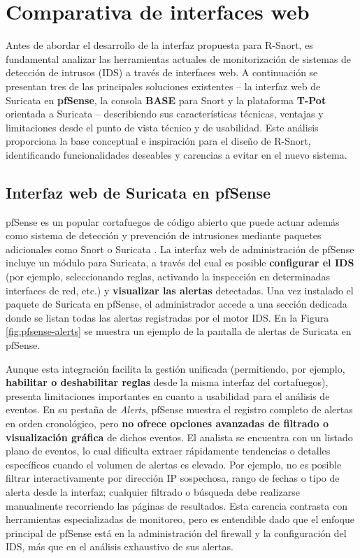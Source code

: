 \documentclass[11pt,a4paper,twoside]{report}
\begin{document}
\section{Comparativa de interfaces web}
Antes de abordar el desarrollo de la interfaz propuesta para R-Snort, es fundamental analizar las herramientas actuales de monitorización de sistemas de detección de intrusos (IDS) a través de interfaces web. A continuación se presentan tres de las principales soluciones existentes -- la interfaz web de Suricata en \textbf{pfSense}, la consola \textbf{BASE} para Snort y la plataforma \textbf{T-Pot} orientada a Suricata -- describiendo sus características técnicas, ventajas y limitaciones desde el punto de vista técnico y de usabilidad. Este análisis proporciona la base conceptual e inspiración para el diseño de R-Snort, identificando funcionalidades deseables y carencias a evitar en el nuevo sistema.\newline

\subsection{Interfaz web de Suricata en pfSense}
pfSense es un popular cortafuegos de código abierto que puede actuar además como sistema de detección y prevención de intrusiones mediante paquetes adicionales como Snort o Suricata \cite{pfsense}. La interfaz web de administración de pfSense incluye un módulo para Suricata, a través del cual es posible \textbf{configurar el IDS} (por ejemplo, seleccionando reglas, activando la inspección en determinadas interfaces de red, etc.) y \textbf{visualizar las alertas} detectadas. Una vez instalado el paquete de Suricata en pfSense, el administrador accede a una sección dedicada donde se listan todas las alertas registradas por el motor IDS. En la Figura \ref{fig:pfsense-alerts} se muestra un ejemplo de la pantalla de alertas de Suricata en pfSense.\newline

Aunque esta integración facilita la gestión unificada (permitiendo, por ejemplo, \textbf{habilitar o deshabilitar reglas} desde la misma interfaz del cortafuegos), presenta limitaciones importantes en cuanto a usabilidad para el análisis de eventos. En su pestaña de \emph{Alerts}, pfSense muestra el registro completo de alertas en orden cronológico, pero \textbf{no ofrece opciones avanzadas de filtrado o visualización gráfica} de dichos eventos. El analista se encuentra con un listado plano de eventos, lo cual dificulta extraer rápidamente tendencias o detalles específicos cuando el volumen de alertas es elevado. Por ejemplo, no es posible filtrar interactivamente por dirección IP sospechosa, rango de fechas o tipo de alerta desde la interfaz; cualquier filtrado o búsqueda debe realizarse manualmente recorriendo las páginas de resultados. Esta carencia contrasta con herramientas especializadas de monitoreo, pero es entendible dado que el enfoque principal de pfSense está en la administración del firewall y la configuración del IDS, más que en el análisis exhaustivo de sus alertas.\newline
\end{document}
